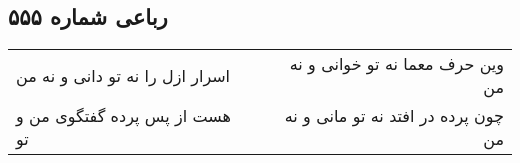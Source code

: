 \begin{center}
\section*{رباعی شماره ۵۵۵}
\label{sec:sh555}
\begin{longtable}{l p{0.5cm} r}
اسرار ازل را نه تو دانی و نه من
&&
وین حرف معما نه تو خوانی و نه من
\\
هست از پس پرده گفتگوی من و تو
&&
چون پرده در افتد نه تو مانی و نه من
\\
\end{longtable}
\end{center}
